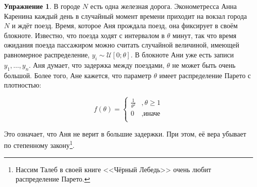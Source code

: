 \documentclass[12pt, a4paper, oneside]{extreport}
\def \mU{\mathcal{U}}
\theoremstyle{plain}              %
\theoremstyle{definition}         %
\newtheorem{problem}{\color{myblue} Упражнение}
\begin{document}
\begin{problem}
В городе $N$ есть одна железная дорога. Эконометресса Анна Каренина каждый день в случайный момент времени приходит на вокзал города $N$ и ждёт поезд. Время, которое Аня прождала поезд, она фиксирует в своём блокноте. Известно, что поезда ходят с интервалом в $\theta$ минут, так что время ожидания поезда пассажиром можно считать случайной величиной, имеющей равномерное распределение, $y_i \sim \mU[0;\theta]$. В блокноте Ани уже есть записи $y_1,\ldots, y_n$. Аня думает, что задержка между поездами, $\theta$ не может быть очень большой. Более того, Ане кажется, что параметр $\theta$ имеет распределение Парето с плотностью: 

\begin{figure}[H]
\begin{minipage}[H]{0.39\linewidth}
\begin{center}
\[ f(\theta) = \begin{cases}
\frac{1}{\theta^2} &, \theta \ge 1 \\
0 &, \text{иначе}\\
\end{cases} \]
\end{center}
\end{minipage}
\hfill
\begin{minipage}[H]{0.59\linewidth}
\begin{center}
\end{center}
\end{minipage}
\end{figure}

Это означает, что Аня не верит в большие задержки. При этом, её вера убывает по степенному закону\footnote{Нассим Талеб в своей книге <<Чёрный Лебедь>> очень любит распределение Парето.}.


\end{problem}
\end{document}
